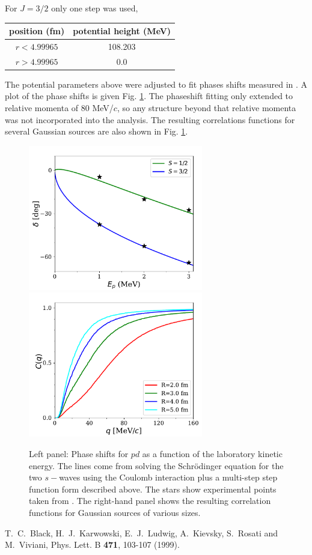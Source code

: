 \documentclass[12pt]{article}
\numberwithin{equation}{section}
\numberwithin{figure}{section}
\begin{document}
For $J=3/2$ only one step was used,\\
\begin{tabular}{|c|c|}
\hline
position (fm) & potential height (MeV)\\
\hline
$r<4.99965$ & 108.203\\
$r>4.99965$ & 0.0\\
\hline
\end{tabular}

The potential parameters above were adjusted to fit phases shifts measured in \cite{Black:1999duc}. A plot of the phase shifts is given Fig. \ref{pdfitfig}. The phaseshift fitting only extended to relative momenta of 80 MeV/$c$, so any structure beyond that relative momenta was not incorporated into the analysis. The resulting correlations functions for several Gaussian sources are also shown in Fig. \ref{pdfitfig}.\\
\begin{figure}
\centerline{\includegraphics[width=3.0in]{phaseshifts_pd}\includegraphics[width=3.0in]{cf_pd}}
\caption{\label{pdfitfig}
Left panel: Phase shifts for $pd$ as a function of the laboratory kinetic energy. The lines come from solving the Schr\"odinger equation for the two $s-$waves using the Coulomb interaction plus a multi-step step function form described above. The stars show experimental points taken from \cite{Black:1999duc}. The right-hand panel shows the resulting correlation functions for Gaussian sources of various sizes.}
\end{figure}

\begin{thebibliography}{99}
T.~C.~Black, H.~J.~Karwowski, E.~J.~Ludwig, A.~Kievsky, S.~Rosati and M.~Viviani,
Phys. Lett. B \textbf{471}, 103-107 (1999).
\end{thebibliography}
\end{document}
